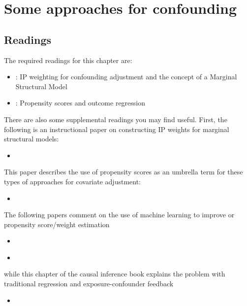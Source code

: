 \documentclass[
]{book}
\providecommand{\tightlist}{%
  \setlength{\itemsep}{0pt}\setlength{\parskip}{0pt}}
\begin{document}
\chapter{Some approaches for confounding}\label{some-approaches-for-confounding}

\section{Readings}\label{readings-5}

The required readings for this chapter are:

\begin{itemize}
\item
  \citet{hernanch12}: IP weighting for confounding adjustment and the concept of a Marginal Structural Model
\item
  \citet{hernanch15}: Propensity scores and outcome regression
\end{itemize}

There are also some supplemental readings you may find useful. First, the following is an instructional paper on constructing IP weights for marginal structural models:

\begin{itemize}
\tightlist
\item
  \citet{cole2008constructing}
\end{itemize}

This paper describes the use of propensity scores as an umbrella term for these types of approaches for covariate adjustment:

\begin{itemize}
\tightlist
\item
  \citet{brookhart2013propensity}
\end{itemize}

The following papers comment on the use of machine learning to improve or propensity score/weight estimation

\begin{itemize}
\item
  \citet{lee2010improving}
\item
  \citet{westreich2010propensity}
\end{itemize}

while this chapter of the causal inference book explains the problem with traditional regression and exposure-confounder feedback

\begin{itemize}
\tightlist
\item
  \citet{hernanch20}
\end{itemize}
\end{document}
